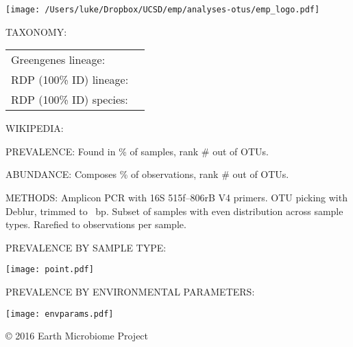 \documentclass[10pt]{amsart}
\begin{document}
\begin{framed} %

\vspace{-6mm}

\begin{center}
\texttt{[image: /Users/luke/Dropbox/UCSD/emp/analyses-otus/emp\_logo.pdf]}
\end{center}

\begin{hangparas}{5.5em}{0}
\texttt{\sequence{}}
\end{hangparas}

\begin{raggedright}
\begin{hangparas}{2em}{1}
    TAXONOMY:   
    
    \begin{small}
    \begin{tabular}{@{} R{3.5cm} @{ } L{11cm}}
    Greengenes lineage: & \taxonomyGG{} \\
    RDP (100\% ID) lineage: & \taxonomyRDP{} \\
    RDP (100\% ID) species: & \speciesA{} \speciesB{} \speciesC{} \\
    \end{tabular}
	\end{small}

    WIKIPEDIA:  \wikipedia{}

    PREVALENCE: Found in \prevalencePercent{}\% of samples,
                rank \#\prevalenceRank{} out of \numOTUs{} OTUs.

    ABUNDANCE:  Composes \abundancePercent{}\% of observations,
                rank \#\abundanceRank{} out of \numOTUs{} OTUs.
            
    METHODS:    Amplicon PCR with 16S 515f--806rB V4 primers.
                OTU picking with Deblur, trimmed to \trimLength{}~bp.
                Subset of \numSamples{} samples with even distribution across sample types.
                Rarefied to \rarefactionDepth{} observations per sample.

\end{hangparas}

PREVALENCE BY SAMPLE TYPE:

\texttt{[image: point.pdf]}

PREVALENCE BY ENVIRONMENTAL PARAMETERS:

\vspace{-3mm}

\begin{center}
\texttt{[image: envparams.pdf]}
\end{center}

\end{raggedright}


\begin{center}
    \copyright{} 2016 Earth Microbiome Project
\end{center}

\end{framed}
\end{document}
